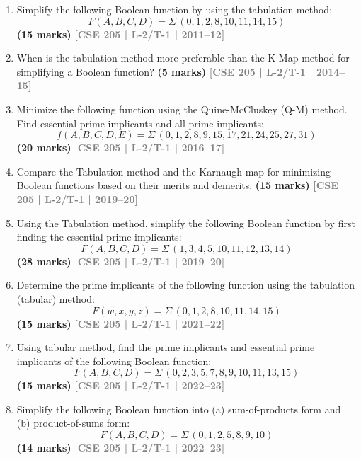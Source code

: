 \documentclass[12pt,a4paper]{article}
\newcommand{\yr}[1]{\hfill\textcolor{gray}{\small\textbf{[#1]}}}
\newcommand{\mk}[1]{\textcolor{orange!70!black}{\small\textbf{(#1 marks)}}}
\begin{document}
\begin{enumerate}

\item Simplify the following Boolean function by using the tabulation method:
\[ F(A,B,C,D) = \Sigma\,(0,1,2,8,10,11,14,15) \]
\mk{15} \yr{CSE 205 | L-2/T-1 | 2011--12}


\item When is the tabulation method more preferable than the K-Map method for simplifying a Boolean function?
\mk{5} \yr{CSE 205 | L-2/T-1 | 2014--15}


\item Minimize the following function using the Quine-McCluskey (Q-M) method. Find essential prime implicants and all prime implicants:
\[ f(A,B,C,D,E) = \Sigma\,(0,1,2,8,9,15,17,21,24,25,27,31) \]
\mk{20} \yr{CSE 205 | L-2/T-1 | 2016--17}


\item Compare the Tabulation method and the Karnaugh map for minimizing Boolean functions based on their merits and demerits.
\mk{15} \yr{CSE 205 | L-2/T-1 | 2019--20}


\item Using the Tabulation method, simplify the following Boolean function by first finding the essential prime implicants:
\[ F(A,B,C,D) = \Sigma\,(1,3,4,5,10,11,12,13,14) \]
\mk{28} \yr{CSE 205 | L-2/T-1 | 2019--20}

\item Determine the prime implicants of the following function using the tabulation (tabular) method:
\[ F(w, x, y, z) = \Sigma\,(0, 1, 2, 8, 10, 11, 14, 15) \]
\mk{15} \yr{CSE 205 | L-2/T-1 | 2021--22}

\item Using tabular method, find the prime implicants and essential prime implicants of the following Boolean function:
\[ F(A, B, C, D) = \Sigma\,(0, 2, 3, 5, 7, 8, 9, 10, 11, 13, 15) \]
\mk{15} \yr{CSE 205 | L-2/T-1 | 2022--23}

\item Simplify the following Boolean function into (a) sum-of-products form and (b) product-of-sums form:
\[ F(A, B, C, D) = \Sigma\,(0, 1, 2, 5, 8, 9, 10) \]
\mk{14} \yr{CSE 205 | L-2/T-1 | 2022--23}


\end{enumerate}
\end{document}
